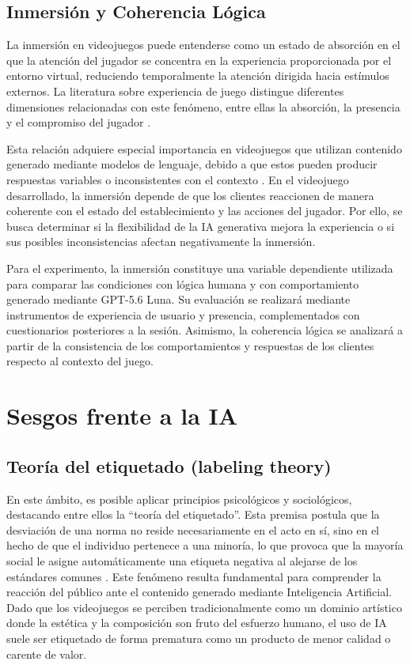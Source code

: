 \subsection{Inmersión y Coherencia Lógica}

La inmersión en videojuegos puede entenderse como un estado de absorción en el que la atención del jugador se concentra en la experiencia proporcionada por el entorno virtual, reduciendo temporalmente la atención dirigida hacia estímulos externos. La literatura sobre experiencia de juego distingue diferentes dimensiones relacionadas con este fenómeno, entre ellas la absorción, la presencia y el compromiso del jugador \cite{brown2004presence,jenett2008measuring}.

Esta relación adquiere especial importancia en videojuegos que utilizan contenido generado mediante modelos de lenguaje, debido a que estos pueden producir respuestas variables o inconsistentes con el contexto \cite{ji2023survey}. En el videojuego desarrollado, la inmersión depende de que los clientes reaccionen de manera coherente con el estado del establecimiento y las acciones del jugador. Por ello, se busca determinar si la flexibilidad de la IA generativa mejora la experiencia o si sus posibles inconsistencias afectan negativamente la inmersión.

Para el experimento, la inmersión constituye una variable dependiente utilizada para comparar las condiciones con lógica humana y con comportamiento generado mediante GPT-5.6 Luna. Su evaluación se realizará mediante instrumentos de experiencia de usuario y presencia, complementados con cuestionarios posteriores a la sesión. Asimismo, la coherencia lógica se analizará a partir de la consistencia de los comportamientos y respuestas de los clientes respecto al contexto del juego. 

\section{Sesgos frente a la IA}
\subsection{Teoría del etiquetado (labeling theory)}

En este ámbito, es posible aplicar principios psicológicos y sociológicos, destacando entre ellos la “teoría del etiquetado”. Esta premisa postula que la desviación de una norma no reside necesariamente en el acto en sí, sino en el hecho de que el individuo pertenece a una minoría, lo que provoca que la mayoría social le asigne automáticamente una etiqueta negativa al alejarse de los estándares comunes \cite{martinez2024etiquetado}. Este fenómeno resulta fundamental para comprender la reacción del público ante el contenido generado mediante Inteligencia Artificial. Dado que los videojuegos se perciben tradicionalmente como un dominio artístico donde la estética y la composición son fruto del esfuerzo humano, el uso de IA suele ser etiquetado de forma prematura como un producto de menor calidad o carente de valor.

